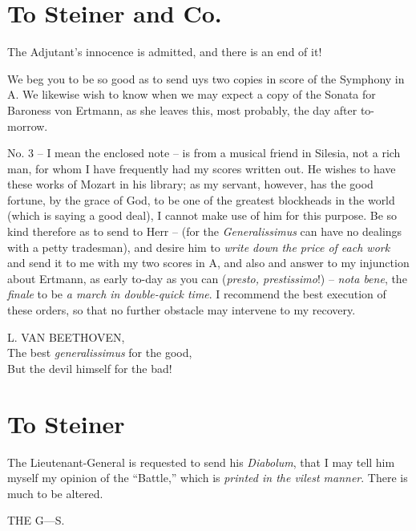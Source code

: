 \documentclass[12pt,oneside]{book}
\begin{document}
\section{To Steiner and Co.}
The Adjutant's innocence is admitted, and there is an end of it!\par 
\vspace{12pt}
We beg you to be so good as to send uys two copies in score of the Symphony in A. We likewise wish to know when we may expect a copy of the Sonata
for Baroness von Ertmann, as she leaves this, most probably, the day after to-morrow. \par 
\vspace{12pt}
No. 3 -- I mean the enclosed note -- is from a musical friend in Silesia, not a rich man, for whom I have frequently had my scores written out. 
He wishes to have these works of Mozart in his library; as my servant, however, has the good fortune, by the grace of God, to be one of the 
greatest blockheads in the world (which is saying a good deal), I cannot make use of him for this purpose. Be so kind therefore as to send to Herr
-- (for the \textit{Generalissimus} can have no dealings with a petty tradesman), and desire him to \textit{write down the price of each work} and
send it to me with my two scores in A, and also and answer to my injunction about Ertmann, as early to-day as you can (\textit{presto, prestissimo}!) --
\textit{nota bene}, the \textit{finale} to be \textit{a march in double-quick time}. I recommend the best execution of these orders, so that no further
obstacle may intervene to my recovery. \par 
\vspace{12pt}
\begin{flushright}
    L. VAN BEETHOVEN, \\
    The best \textit{generalissimus} for the good, \\
    But the devil himself for the bad!
\end{flushright}

\section{To Steiner}
The Lieutenant-General is requested to send his \textit{Diabolum}, that I may tell him myself my opinion of the ``Battle,'' which is 
\textit{printed in the vilest manner}. There is much to be altered. \par 
\vspace{12pt}
\begin{flushright}
    THE G---S.
\end{flushright}
\end{document}
